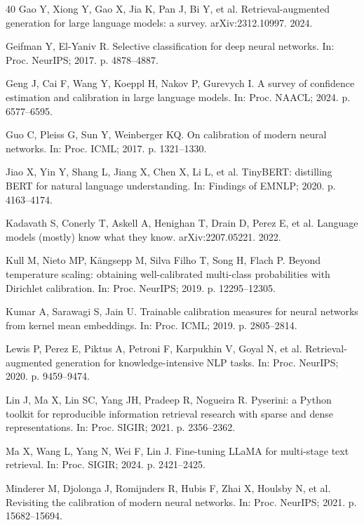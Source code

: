 \documentclass[sn-mathphys-num,pdflatex]{sn-jnl}
\begin{document}
\begin{thebibliography}{40}
 Gao Y, Xiong Y, Gao X, Jia K, Pan J, Bi Y, et al.
Retrieval-augmented generation for large language models: a survey.
arXiv:2312.10997. 2024.

 Geifman Y, El-Yaniv R. Selective classification for deep
neural networks. In: Proc. NeurIPS; 2017. p. 4878--4887.

 Geng J, Cai F, Wang Y, Koeppl H, Nakov P, Gurevych I. A
survey of confidence estimation and calibration in large language models. In:
Proc. NAACL; 2024. p. 6577--6595.

 Guo C, Pleiss G, Sun Y, Weinberger KQ. On calibration of modern
neural networks. In: Proc. ICML; 2017. p. 1321--1330.

 Jiao X, Yin Y, Shang L, Jiang X, Chen X, Li L, et al.
TinyBERT: distilling BERT for natural language understanding. In: Findings of
EMNLP; 2020. p. 4163--4174.

 Kadavath S, Conerly T, Askell A, Henighan T, Drain D,
Perez E, et al. Language models (mostly) know what they know. arXiv:2207.05221.
2022.

 Kull M, Nieto MP, K\"angsepp M, Silva Filho T, Song H, Flach P.
Beyond temperature scaling: obtaining well-calibrated multi-class probabilities
with Dirichlet calibration. In: Proc. NeurIPS; 2019. p. 12295--12305.

 Kumar A, Sarawagi S, Jain U. Trainable calibration measures
for neural networks from kernel mean embeddings. In: Proc. ICML; 2019. p.
2805--2814.

 Lewis P, Perez E, Piktus A, Petroni F, Karpukhin V, Goyal
N, et al. Retrieval-augmented generation for knowledge-intensive NLP tasks. In:
Proc. NeurIPS; 2020. p. 9459--9474.

 Lin J, Ma X, Lin SC, Yang JH, Pradeep R, Nogueira R.
Pyserini: a Python toolkit for reproducible information retrieval research with
sparse and dense representations. In: Proc. SIGIR; 2021. p. 2356--2362.

 Ma X, Wang L, Yang N, Wei F, Lin J. Fine-tuning LLaMA
for multi-stage text retrieval. In: Proc. SIGIR; 2024. p. 2421--2425.

 Minderer M, Djolonga J, Romijnders R, Hubis F, Zhai X,
Houlsby N, et al. Revisiting the calibration of modern neural networks. In: Proc.
NeurIPS; 2021. p. 15682--15694.


\end{thebibliography}
\end{document}
